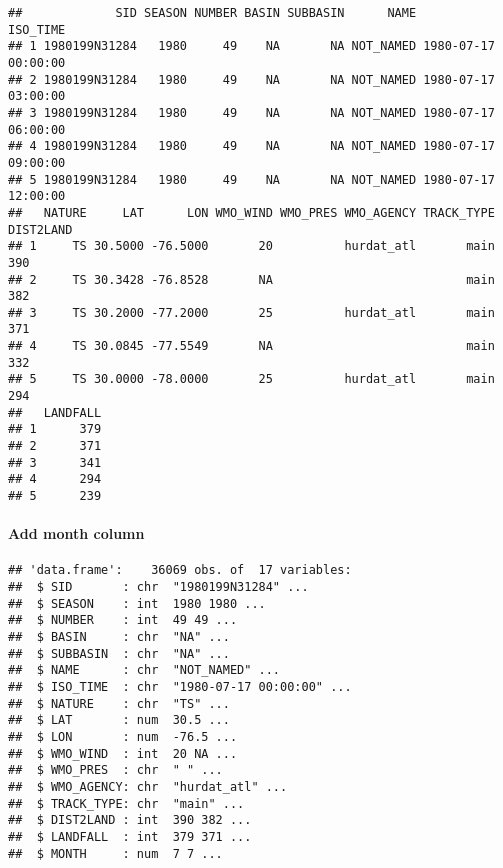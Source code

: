 \documentclass[
]{article}
\newenvironment{Shaded}{\begin{snugshade}}{\end{snugshade}}
\newcommand{\DataTypeTok}[1]{\textcolor[rgb]{0.13,0.29,0.53}{#1}}
\newcommand{\DecValTok}[1]{\textcolor[rgb]{0.00,0.00,0.81}{#1}}
\newcommand{\KeywordTok}[1]{\textcolor[rgb]{0.13,0.29,0.53}{\textbf{#1}}}
\newcommand{\NormalTok}[1]{#1}
\newcommand{\OperatorTok}[1]{\textcolor[rgb]{0.81,0.36,0.00}{\textbf{#1}}}
\begin{document}
\begin{verbatim}
##             SID SEASON NUMBER BASIN SUBBASIN      NAME            ISO_TIME
## 1 1980199N31284   1980     49    NA       NA NOT_NAMED 1980-07-17 00:00:00
## 2 1980199N31284   1980     49    NA       NA NOT_NAMED 1980-07-17 03:00:00
## 3 1980199N31284   1980     49    NA       NA NOT_NAMED 1980-07-17 06:00:00
## 4 1980199N31284   1980     49    NA       NA NOT_NAMED 1980-07-17 09:00:00
## 5 1980199N31284   1980     49    NA       NA NOT_NAMED 1980-07-17 12:00:00
##   NATURE     LAT      LON WMO_WIND WMO_PRES WMO_AGENCY TRACK_TYPE DIST2LAND
## 1     TS 30.5000 -76.5000       20          hurdat_atl       main       390
## 2     TS 30.3428 -76.8528       NA                           main       382
## 3     TS 30.2000 -77.2000       25          hurdat_atl       main       371
## 4     TS 30.0845 -77.5549       NA                           main       332
## 5     TS 30.0000 -78.0000       25          hurdat_atl       main       294
##   LANDFALL
## 1      379
## 2      371
## 3      341
## 4      294
## 5      239
\end{verbatim}

\hypertarget{add-month-column}{%
\paragraph{Add month column}\label{add-month-column}}

\begin{Shaded}
\end{Shaded}

\begin{verbatim}
## 'data.frame':    36069 obs. of  17 variables:
##  $ SID       : chr  "1980199N31284" ...
##  $ SEASON    : int  1980 1980 ...
##  $ NUMBER    : int  49 49 ...
##  $ BASIN     : chr  "NA" ...
##  $ SUBBASIN  : chr  "NA" ...
##  $ NAME      : chr  "NOT_NAMED" ...
##  $ ISO_TIME  : chr  "1980-07-17 00:00:00" ...
##  $ NATURE    : chr  "TS" ...
##  $ LAT       : num  30.5 ...
##  $ LON       : num  -76.5 ...
##  $ WMO_WIND  : int  20 NA ...
##  $ WMO_PRES  : chr  " " ...
##  $ WMO_AGENCY: chr  "hurdat_atl" ...
##  $ TRACK_TYPE: chr  "main" ...
##  $ DIST2LAND : int  390 382 ...
##  $ LANDFALL  : int  379 371 ...
##  $ MONTH     : num  7 7 ...
\end{verbatim}
\end{document}
